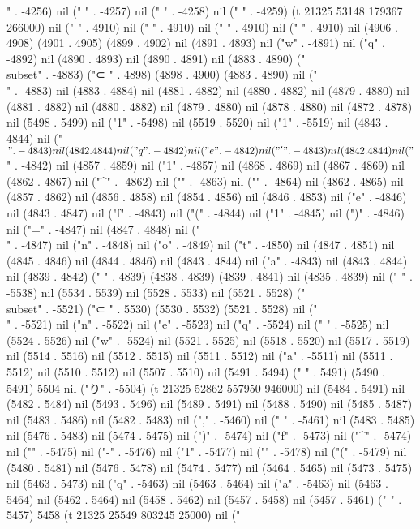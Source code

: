 " . -4256) nil (" " . -4257) nil (" " . -4258) nil (" " . -4259) (t 21325 53148 179367 266000) nil (" " . 4910) nil (" " . 4910) nil (" " . 4910) nil ("
" . 4910) nil (4906 . 4908) (4901 . 4905) (4899 . 4902) nil (4891 . 4893) nil ("w" . -4891) nil ("q" . -4892) nil (4890 . 4893) nil (4890 . 4891) nil (4883 . 4890) ("\\subset" . -4883) ("⊂
" . 4898) (4898 . 4900) (4883 . 4890) nil ("\\" . -4883) nil (4883 . 4884) nil (4881 . 4882) nil (4880 . 4882) nil (4879 . 4880) nil (4881 . 4882) nil (4880 . 4882) nil (4879 . 4880) nil (4878 . 4880) nil (4872 . 4878) nil (5498 . 5499) nil ("1" . -5498) nil (5519 . 5520) nil ("1" . -5519) nil (4843 . 4844) nil ("$" . -4843) nil (4842 . 4844) nil ("q" . -4842) nil ("e" . -4842) nil ("'" . -4843) nil (4842 . 4844) nil ("$" . -4842) nil (4857 . 4859) nil ("1" . -4857) nil (4868 . 4869) nil (4867 . 4869) nil (4862 . 4867) nil ("^" . -4862) nil ("{" . -4863) nil ("}" . -4864) nil (4862 . 4865) nil (4857 . 4862) nil (4856 . 4858) nil (4854 . 4856) nil (4846 . 4853) nil ("e" . -4846) nil (4843 . 4847) nil ("f" . -4843) nil ("(" . -4844) nil ("1" . -4845) nil (")" . -4846) nil ("=" . -4847) nil (4847 . 4848) nil ("\\" . -4847) nil ("n" . -4848) nil ("o" . -4849) nil ("t" . -4850) nil (4847 . 4851) nil (4845 . 4846) nil (4844 . 4846) nil (4843 . 4844) nil ("a" . -4843) nil (4843 . 4844) nil (4839 . 4842) (" " . 4839) (4838 . 4839) (4839 . 4841) nil (4835 . 4839) nil (" " . -5538) nil (5534 . 5539) nil (5528 . 5533) nil (5521 . 5528) ("\\subset" . -5521) ("⊂
" . 5530) (5530 . 5532) (5521 . 5528) nil ("\\" . -5521) nil ("n" . -5522) nil ("e" . -5523) nil ("q" . -5524) nil (" " . -5525) nil (5524 . 5526) nil ("w" . -5524) nil (5521 . 5525) nil (5518 . 5520) nil (5517 . 5519) nil (5514 . 5516) nil (5512 . 5515) nil (5511 . 5512) nil ("a" . -5511) nil (5511 . 5512) nil (5510 . 5512) nil (5507 . 5510) nil (5491 . 5494) (" " . 5491) (5490 . 5491) 5504 nil ("り" . -5504) (t 21325 52862 557950 946000) nil (5484 . 5491) nil (5482 . 5484) nil (5493 . 5496) nil (5489 . 5491) nil (5488 . 5490) nil (5485 . 5487) nil (5483 . 5486) nil (5482 . 5483) nil ("," . -5460) nil (" " . -5461) nil (5483 . 5485) nil (5476 . 5483) nil (5474 . 5475) nil (")" . -5474) nil ("f" . -5473) nil ("^" . -5474) nil ("{" . -5475) nil ("-" . -5476) nil ("1" . -5477) nil ("}" . -5478) nil ("(" . -5479) nil (5480 . 5481) nil (5476 . 5478) nil (5474 . 5477) nil (5464 . 5465) nil (5473 . 5475) nil (5463 . 5473) nil ("q" . -5463) nil (5463 . 5464) nil ("a" . -5463) nil (5463 . 5464) nil (5462 . 5464) nil (5458 . 5462) nil (5457 . 5458) nil (5457 . 5461) (" " . 5457) 5458 (t 21325 25549 803245 25000) nil ("
